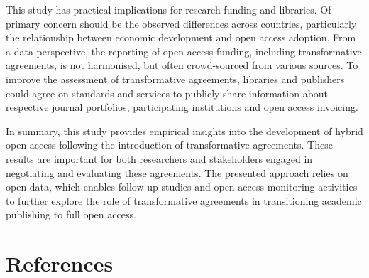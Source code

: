 \documentclass[a4paper,man,floatsintext,longtable,noextraspace,12pt]{apa6}
\begin{document}
This study has practical implications for research funding and
libraries. Of primary concern should be the observed differences across
countries, particularly the relationship between economic development
and open access adoption. From a data perspective, the reporting of open
access funding, including transformative agreements, is not harmonised,
but often crowd-sourced from various sources. To improve the assessment
of transformative agreements, libraries and publishers could agree on
standards and services to publicly share information about respective
journal portfolios, participating institutions and open access
invoicing.

In summary, this study provides empirical insights into the development
of hybrid open access following the introduction of transformative
agreements. These results are important for both researchers and
stakeholders engaged in negotiating and evaluating these agreements. The
presented approach relies on open data, which enables follow-up studies
and open access monitoring activities to further explore the role of
transformative agreements in transitioning academic publishing to full
open access.

\hypertarget{references}{%
\section*{References}\label{references}}
\end{document}

